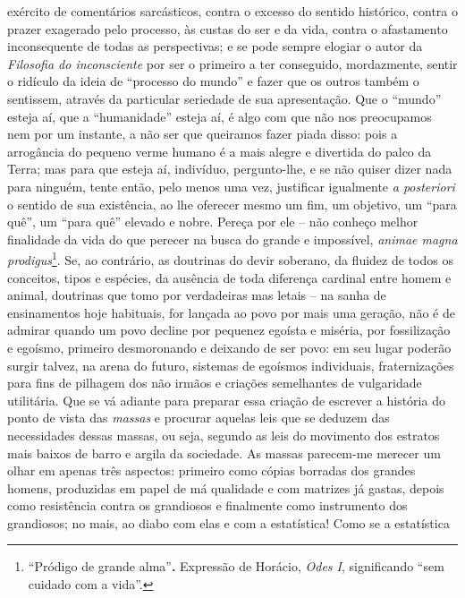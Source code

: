     exército de comentários sarcásticos, contra o excesso do sentido
    histórico, contra o prazer exagerado pelo processo, às custas do ser
    e da vida, contra o afastamento inconsequente de todas as
    perspectivas; e se pode sempre elogiar o autor da \emph{Filosofia do
    inconsciente} por ser o primeiro a ter conseguido, mordazmente,
    sentir o ridículo da ideia de ``processo do mundo'' e fazer que os
    outros também o sentissem, através da particular seriedade de sua
    apresentação. Que o ``mundo'' esteja aí, que a ``humanidade'' esteja
    aí, é algo com que não nos preocupamos nem por um instante, a não
    ser que queiramos fazer piada disso: pois a arrogância do pequeno
    verme humano é a mais alegre e divertida do palco da Terra; mas para
    que esteja aí, indivíduo, pergunto-lhe, e se não quiser dizer nada
    para ninguém, tente então, pelo menos uma vez, justificar igualmente
    \emph{a posteriori} o sentido de sua existência, ao lhe oferecer
    mesmo um fim, um objetivo, um ``para quê'', um ``para quê'' elevado
    e nobre. Pereça por ele -- não conheço melhor finalidade da vida do
    que perecer na busca do grande e impossível, \emph{animae magna
    prodigus}\footnote{``Pródigo de grande alma''\textbf{.} Expressão de
      Horácio, \emph{Odes I}, significando ``sem cuidado com a vida''.}. Se, ao
    contrário, as doutrinas do devir soberano, da fluidez de todos os
    conceitos, tipos e espécies, da ausência de toda diferença cardinal
    entre homem e animal, doutrinas que tomo por verdadeiras mas letais
    -- na sanha de ensinamentos hoje habituais, for lançada ao povo por
    mais uma geração, não é de admirar quando um povo decline por
    pequenez egoísta e miséria, por fossilização e egoísmo, primeiro
    desmoronando e deixando de ser povo: em seu lugar poderão surgir
    talvez, na arena do futuro, sistemas de egoísmos individuais,
    fraternizações para fins de pilhagem dos não irmãos e criações
    semelhantes de vulgaridade utilitária. Que se vá adiante para
    preparar essa criação de escrever a história do ponto de vista das
    \emph{massas} e procurar aquelas leis que se deduzem das
    necessidades dessas massas, ou seja, segundo as leis do movimento
    dos estratos mais baixos de barro e argila da sociedade. As massas
    parecem-me merecer um olhar em apenas três aspectos: primeiro como
    cópias borradas dos grandes homens, produzidas em papel de má
    qualidade e com matrizes já gastas, depois como resistência contra
    os grandiosos e finalmente como instrumento dos grandiosos; no mais,
    ao diabo com elas e com a estatística! Como se a estatística
